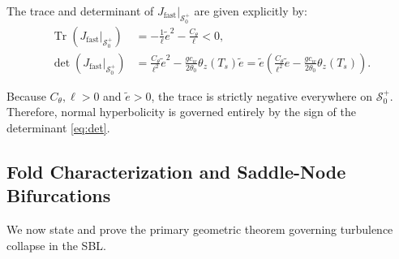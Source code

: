 The trace and determinant of $\left. J_{\mathrm{fast}} \right|_{\mathcal{S}_0^+}$ are given explicitly by:
\begin{align}
\operatorname{Tr}\left(\left. J_{\mathrm{fast}} \right|_{\mathcal{S}_0^+}\right) &= -\frac{1}{\ell} \tilde e^2 - \frac{C_\theta}{\ell} < 0, \label{eq:trace} \\
\det\left(\left. J_{\mathrm{fast}} \right|_{\mathcal{S}_0^+}\right) &= \frac{C_\theta}{\ell^2} \tilde e^2 - \frac{g c_w}{2\theta_0} \theta_z(T_s) \tilde e = \tilde e \left( \frac{C_\theta}{\ell^2} \tilde e - \frac{g c_w}{2\theta_0} \theta_z(T_s) \right). \label{eq:det}
\end{align}

Because $C_\theta, \ell > 0$ and $\tilde e > 0$, the trace is strictly negative everywhere on $\mathcal{S}_0^+$. Therefore, normal hyperbolicity is governed entirely by the sign of the determinant \eqref{eq:det}.

\subsection{Fold Characterization and Saddle-Node Bifurcations}

We now state and prove the primary geometric theorem governing turbulence collapse in the SBL.

